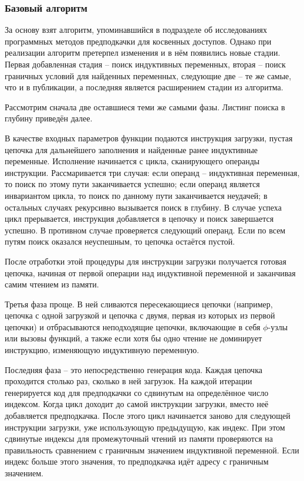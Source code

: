 \documentclass[12pt,a4paper,oneside]{article}
\begin{document}
\subsubsection{Базовый алгоритм}

\indent

За основу взят алгоритм, упоминавшийся в подразделе об исследованиях программных методов предподкачки для косвенных доступов\cite{AinsworthIA}. Однако при реализации алгоритм претерпел изменения и в нём появились новые стадии. Первая добавленная стадия -- поиск индуктивных переменных, вторая -- поиск граничных условий для найденных переменных, следующие две -- те же самые, что и в публикации, а последняя является расширением стадии из алгоритма.

Рассмотрим сначала две оставшиеся теми же самыми фазы. Листинг поиска в глубину приведён далее.



В качестве входных параметров функции подаются инструкция загрузки, пустая цепочка для дальнейшего заполнения и найденные ранее индуктивные переменные. Исполнение начинается с цикла, сканирующего операнды инструкции. Рассмаривается три случая: если операнд -- индуктивная переменная, то поиск по этому пути заканчивается успешно; если операнд является инвариантом цикла, то поиск по данному пути заканчивается неудачей; в остальных случаях рекурсивно вызывается поиск в глубину. В случае успеха цикл прерывается, инструкция добавляется в цепочку и поиск завершается успешно. В противном случае проверяется следующий операнд. Если по всем путям поиск оказался неуспешным, то цепочка остаётся пустой.

После отработки этой процедуры для инструкции загрузки получается готовая цепочка, начиная от первой операции над индуктивной переменной и заканчивая самим чтением из памяти.

Третья фаза проще. В ней сливаются пересекающиеся цепочки (например, цепочка с одной загрузкой и цепочка с двумя, первая из которых из первой цепочки) и отбрасываются неподходящие цепочки, включающие в себя $\phi$-узлы или вызовы функций, а также если хотя бы одно чтение не доминирует инструкцию, изменяющую индуктивную переменную.

Последняя фаза -- это непосредственно генерация кода. Каждая цепочка проходится столько раз, сколько в ней загрузок. На каждой итерации генерируется код для предподкачки со сдвинутым на определённое число индексом. Когда цикл доходит до самой инструкции загрузки, вместо неё добавляется предподкачка. После этого цикл начинается заново для следующей инструкции загрузки, уже использующую предыдущую, как индекс. При этом сдвинутые индексы для промежуточный чтений из памяти проверяются на правильность сравнением с граничным значением индуктивной переменной. Если индекс больше этого значения, то предподкачка идёт адресу с граничным значением.
\end{document}
